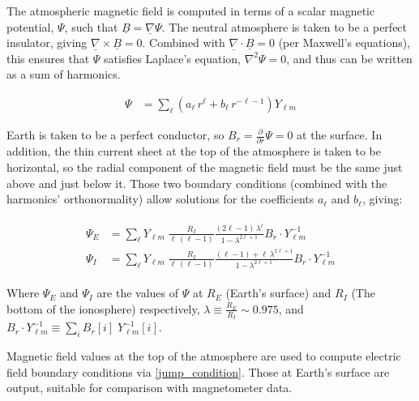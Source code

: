 \documentclass[draft,linenumbers]{agujournal}
\begin{document}
The atmospheric magnetic field is computed in terms of a scalar magnetic potential, $\Psi$, such that $\underline{B}=\underline{\nabla} \Psi$. The neutral atmosphere is taken to be a perfect insulator, giving $\underline{\nabla} \times \underline{B}=0$. Combined with $\underline{\nabla} \cdot \underline{B}=0$ (per Maxwell's equations), this ensures that $\Psi$ satisfies Laplace's equation, $\nabla^2 \Psi = 0$, and thus can be written as a sum of harmonics\citep{jackson_1999}.
\begin{linenomath*}
\begin{align}
  \label{psi_expansion}
  \Psi &= \displaystyle\sum_\ell \left( a_\ell \, r^\ell +
    b_\ell \, r^{-\ell - 1} \right) Y_{\ell m}
\end{align}
\end{linenomath*}

Earth is taken to be a perfect conductor, so $B_r = \frac{\partial}{\partial r} \Psi = 0$ at the surface. In addition, the thin current sheet at the top of the atmosphere is taken to be horizontal, so the radial component of the magnetic field must be the same just above and just below it. Those two boundary conditions (combined with the harmonics' orthonormality) allow solutions for the coefficients $a_\ell$ and $b_\ell$, giving:
\begin{linenomath*}
\begin{align}
  \label{psi_final}
  \begin{split}
  \Psi_E &= \displaystyle\sum_\ell Y_{\ell m} \; \frac{R_I}{ \ell \, \left(\ell - 1\right) } \frac{ \left(2 \ell - 1\right) \, \lambda^\ell }{ 1 - \lambda^{2 \ell + 1} } B_r \cdot Y_{\ell m}^{-1} \\
  \Psi_I &= \displaystyle\sum_\ell Y_{\ell m} \; \frac{R_I}{ \ell \, \left(\ell - 1\right) } \frac{ \left(\ell - 1\right) + \ell \, \lambda^{2 \ell + 1} }{ 1 - \lambda^{2 \ell + 1} } B_r \cdot Y_{\ell m}^{-1}
  \end{split}
\end{align}
\end{linenomath*}

Where $\Psi_E$ and $\Psi_I$ are the values of $\Psi$ at $R_E$ (Earth's surface) and $R_I$ (The bottom of the ionosphere) respectively, $\lambda \equiv \frac{R_E}{R_I} \sim \num{0.975}$, and $B_r \cdot Y_{\ell m}^{-1} \equiv \displaystyle\sum_i B_r [i] \; Y_{\ell m}^{-1} \! [i]$.

Magnetic field values at the top of the atmosphere are used to compute electric field boundary conditions via \cref{jump_condition}. Those at Earth's surface are output, suitable for comparison with magnetometer data.
\end{document}
